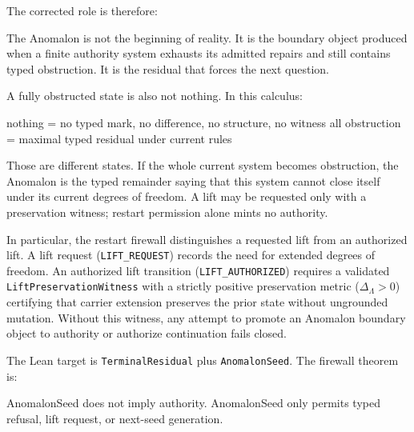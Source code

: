 \documentclass[
  10pt,
]{article}
\newenvironment{Shaded}{}{}
\newcommand{\NormalTok}[1]{#1}
\DeclareRobustCommand{\texttt}[1]{{\paperSymbolFont\nolinkurl{#1}}}
\begin{document}
The corrected role is therefore:

\begin{Shaded}
\begin{Highlighting}[]
\NormalTok{The Anomalon is not the beginning of reality.}
\NormalTok{It is the boundary object produced when a finite authority system exhausts its admitted repairs and still contains typed obstruction.}
\NormalTok{It is the residual that forces the next question.}
\end{Highlighting}
\end{Shaded}

A fully obstructed state is also not nothing. In this calculus:

\begin{Shaded}
\begin{Highlighting}[]
\NormalTok{nothing = no typed mark, no difference, no structure, no witness}
\NormalTok{all obstruction = maximal typed residual under current rules}
\end{Highlighting}
\end{Shaded}

Those are different states. If the whole current system becomes obstruction, the Anomalon is the typed remainder saying that this system cannot close itself under its current degrees of freedom. A lift may be requested only with a preservation witness; restart permission alone mints no authority.

In particular, the restart firewall distinguishes a requested lift from an authorized lift. A lift request (\texttt{LIFT\_REQUEST}) records the need for extended degrees of freedom. An authorized lift transition (\texttt{LIFT\_AUTHORIZED}) requires a validated \texttt{LiftPreservationWitness} with a strictly positive preservation metric (\protect\hypertarget{math-E0001-0001}{}{\(\Delta_\Lambda > 0\)}) certifying that carrier extension preserves the prior state without ungrounded mutation. Without this witness, any attempt to promote an Anomalon boundary object to authority or authorize continuation fails closed.

The Lean target is \texttt{TerminalResidual} plus \texttt{AnomalonSeed}. The firewall theorem is:

\begin{Shaded}
\begin{Highlighting}[]
\NormalTok{AnomalonSeed does not imply authority.}
\NormalTok{AnomalonSeed only permits typed refusal, lift request, or next{-}seed generation.}
\end{Highlighting}
\end{Shaded}
\end{document}
